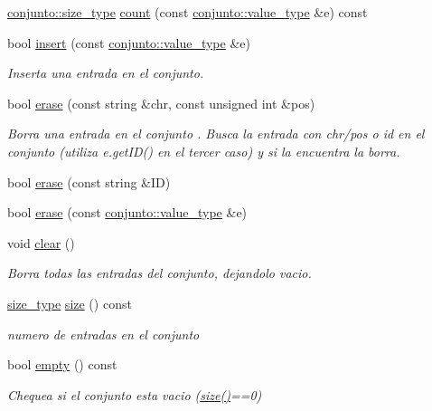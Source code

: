 \begin{DoxyCompactItemize}
\item 
\hyperlink{classconjunto_a855a5893bb0f5a851ab2dbf2b8aa6cc7}{conjunto\+::size\+\_\+type} \hyperlink{classconjunto_a1969568dd7cdcd2599e29540bdbf0146}{count} (const \hyperlink{classconjunto_ad902faf0206fe6aa37e39d8e6e5a880a}{conjunto\+::value\+\_\+type} \&e) const 
\item 
bool \hyperlink{classconjunto_a1b80ac564092cff71e21d6452f376769}{insert} (const \hyperlink{classconjunto_ad902faf0206fe6aa37e39d8e6e5a880a}{conjunto\+::value\+\_\+type} \&e)
\begin{DoxyCompactList}\small\item\em Inserta una entrada en el conjunto. \end{DoxyCompactList}\item 
bool \hyperlink{classconjunto_a3ea4aaba4c87317d49d5fd6091ca9f70}{erase} (const string \&chr, const unsigned int \&pos)
\begin{DoxyCompactList}\small\item\em Borra una entrada en el conjunto . Busca la entrada con chr/pos o id en el conjunto (utiliza e.\+get\+I\+D() en el tercer caso) y si la encuentra la borra. \end{DoxyCompactList}\item 
bool \hyperlink{classconjunto_a1bfa5a542034b4dec5a4950d92c4b4a4}{erase} (const string \&ID)
\item 
bool \hyperlink{classconjunto_adb87e98f2c127dc030d5861d6f0172c6}{erase} (const \hyperlink{classconjunto_ad902faf0206fe6aa37e39d8e6e5a880a}{conjunto\+::value\+\_\+type} \&e)
\item 
void \hyperlink{classconjunto_abf4c49c1a3f356d1e5bc668c8288c040}{clear} ()
\begin{DoxyCompactList}\small\item\em Borra todas las entradas del conjunto, dejandolo vacio. \end{DoxyCompactList}\item 
\hyperlink{classconjunto_a855a5893bb0f5a851ab2dbf2b8aa6cc7}{size\+\_\+type} \hyperlink{classconjunto_a863e1e106e35adda47e7c5e2067295b9}{size} () const 
\begin{DoxyCompactList}\small\item\em numero de entradas en el conjunto \end{DoxyCompactList}\item 
bool \hyperlink{classconjunto_afcf4ff3ff3c1f83b63e901efebe93533}{empty} () const 
\begin{DoxyCompactList}\small\item\em Chequea si el conjunto esta vacio (\hyperlink{classconjunto_a863e1e106e35adda47e7c5e2067295b9}{size()}==0) \end{DoxyCompactList}\item 

\end{DoxyCompactItemize}
